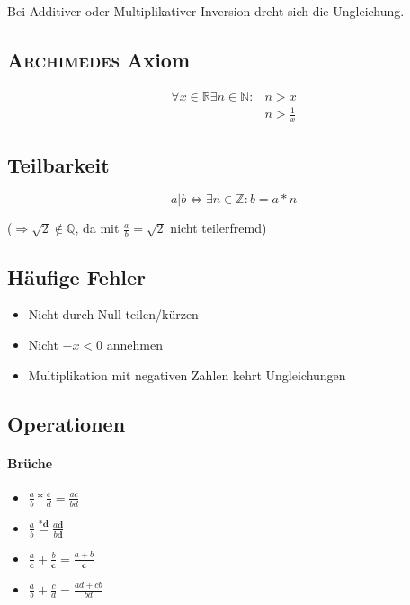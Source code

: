 Bei Additiver oder Multiplikativer Inversion dreht sich die Ungleichung.

\subsection{\textsc{Archimedes} Axiom}

\begin{align*}
  \forall x \in \mathbb{R} \exists n \in \mathbb{N}: & n > x           \\
                                                     & n > \frac{1}{x}
\end{align*}

\subsection{Teilbarkeit}

$$a | b \Leftrightarrow \exists n \in \mathbb{Z}: b = a * n$$

($\Rightarrow \sqrt{2} \notin \mathbb{Q}$, da mit $\frac{a}{b} = \sqrt{2}$ nicht teilerfremd)

\subsection{Häufige Fehler}

\begin{itemize}
  \item Nicht durch Null teilen/kürzen

  \item Nicht $-x < 0$ annehmen

  \item Multiplikation mit negativen Zahlen kehrt Ungleichungen
\end{itemize}

\subsection{Operationen}

\paragraph{Brüche}

\begin{itemize}
  \item $\frac{a}{b} * \frac{c}{d} = \frac{a c}{b d}$

  \item $\frac{a}{b} \overset{\mathbf{* d}}{=} \frac{a \mathbf{d}}{b \mathbf{d}}$

  \item $\frac{a}{\mathbf{c}} + \frac{b}{\mathbf{c}} = \frac{a + b}{\mathbf{c}}$

  \item $\frac{a}{b} + \frac{c}{d} = \frac{ad + cb}{bd}$
\end{itemize}

